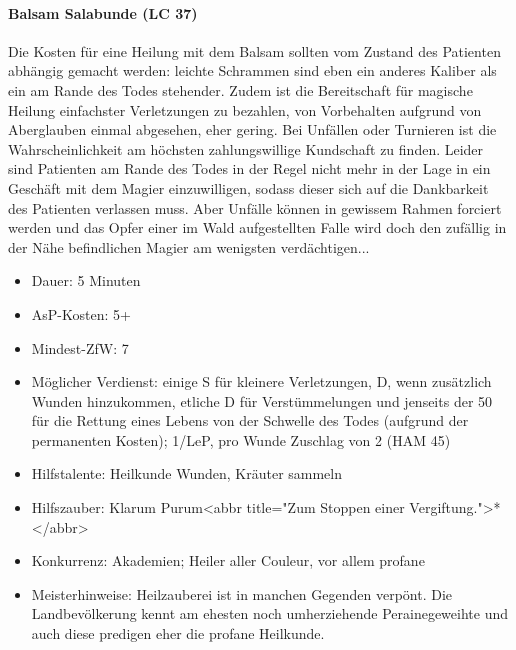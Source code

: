 \paragraph{Balsam Salabunde (LC 37)}
Die Kosten für eine Heilung mit dem Balsam sollten vom Zustand des Patienten abhängig gemacht werden: leichte Schrammen sind eben ein anderes Kaliber als ein am Rande des Todes stehender. Zudem ist die Bereitschaft für magische Heilung einfachster Verletzungen zu bezahlen, von Vorbehalten aufgrund von Aberglauben einmal abgesehen, eher gering. Bei Unfällen oder Turnieren ist die Wahrscheinlichkeit am höchsten zahlungswillige Kundschaft zu finden. Leider sind Patienten am Rande des Todes in der Regel nicht mehr in der Lage in ein Geschäft mit dem Magier einzuwilligen, sodass dieser sich auf die Dankbarkeit des Patienten verlassen muss. Aber Unfälle können in gewissem Rahmen forciert werden und das Opfer einer im Wald aufgestellten Falle wird doch den zufällig in der Nähe befindlichen Magier am wenigsten verdächtigen...
\begin{itemize}
	\item Dauer: 5 Minuten
	\item AsP-Kosten: 5+
	\item Mindest-ZfW: 7
	\item Möglicher Verdienst: einige S für kleinere Verletzungen, D, wenn zusätzlich Wunden hinzukommen, etliche D für Verstümmelungen und jenseits der \SI{50}{\D} für die Rettung eines Lebens von der Schwelle des Todes (aufgrund der permanenten Kosten); \SI{1}{\D}/LeP, pro Wunde Zuschlag von \SI{2}{\D} (HAM 45)
	\item Hilfstalente: Heilkunde Wunden, Kräuter sammeln
	\item Hilfszauber: Klarum Purum<abbr title="Zum Stoppen einer Vergiftung.">*</abbr>
	\item Konkurrenz: Akademien; Heiler aller Couleur, vor allem profane
	\item Meisterhinweise: Heilzauberei ist in manchen Gegenden verpönt. Die Landbevölkerung kennt am ehesten noch umherziehende Perainegeweihte und auch diese predigen eher die profane Heilkunde.
\end{itemize}

